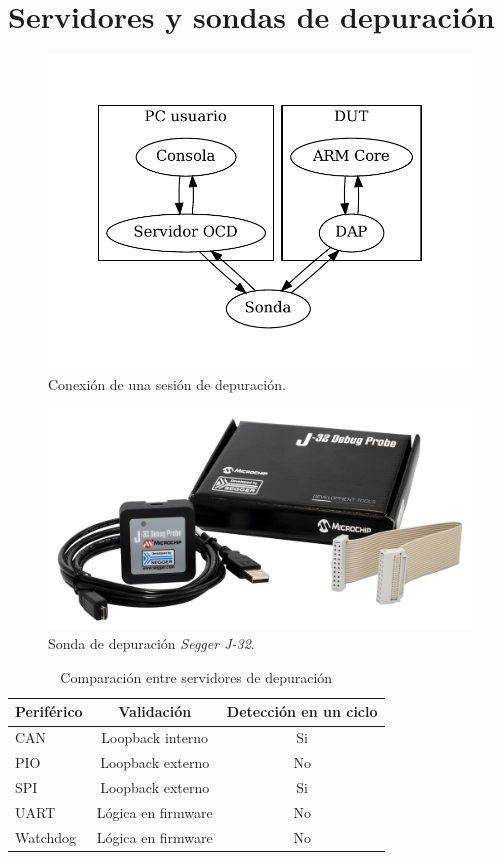 \section{Servidores y sondas de depuración}
\label{sec:depuracion}

\begin{figure}[htbp]
	\centering
	\includegraphics[width=.8\textwidth]{./Figures/debug.pdf}
    \caption{Conexión de una sesión de depuración.}
	\label{fig:debug}
\end{figure}

\begin{figure}[htbp]
	\centering
	\includegraphics[width=.8\textwidth]{./Figures/segger.jpg}
    \caption{Sonda de depuración \emph{Segger J-32}.}
	\label{fig:sonda}
\end{figure}

\begin{table}[h]
	\centering
	\caption[Servidores de depuración]{Comparación entre servidores de depuración}
	\begin{tabular}{l c c}    
		\toprule
        \textbf{Periférico} & \textbf{Validación}       & \textbf{Detección en un ciclo}\\
		\midrule
		CAN                 & Loopback interno          & Si\\		
		PIO                 & Loopback externo          & No\\
		SPI                 & Loopback externo          & Si\\
		UART                & Lógica en firmware        & No\\
		Watchdog            & Lógica en firmware        & No\\
		\bottomrule
		\hline
	\end{tabular}
	\label{tab:perifericos}
\end{table}

